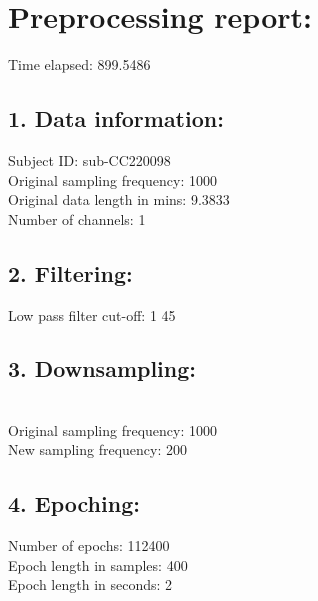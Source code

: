 \documentclass[10pt,a4paper,oneside]{report}
\begin{document}
\author{Veronika Shamova}
\date{\taday}
\section*{Preprocessing report:}
Time elapsed:  899.5486\\ 
\subsection*{1. Data information:}
Subject ID: sub-CC220098
\\ Original sampling frequency: 1000 
\\ Original data length in mins: 9.3833 
\\ Number of channels: 1 
\subsection*{2. Filtering:}
Low pass filter cut-off: 1  45
\subsection*{3. Downsampling:}
\\ Original sampling frequency: 1000
\\ New sampling frequency: 200
\subsection*{4. Epoching:}
Number of epochs: 112400 
\\ Epoch length in samples: 400 
\\ Epoch length in seconds: 2 
\end{document}

